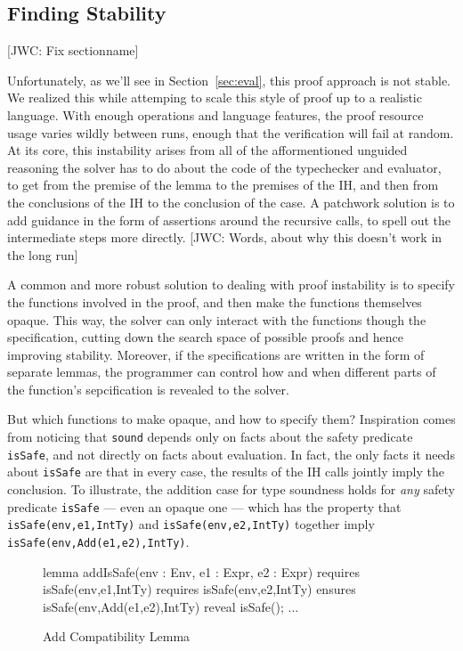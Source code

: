 \documentclass[sigplan,review,screen,anonymous]{acmart}
\newcommand{\comm}[3]{\textcolor{#1}{[#2: #3]}}
\newcommand{\jwc}[1]{\comm{dkgreen}{JWC}{#1}}
\begin{document}
\subsection*{Finding Stability}
\jwc{Fix sectionname}

Unfortunately, as we'll see in Section~\ref{sec:eval}, this proof approach is
not stable. We realized this while attemping to scale this style
of proof up to a realistic language. With enough operations and language
features, the proof resource usage varies wildly between runs,
enough that the verification will fail at random. At its core, this
instability arises from all of the afformentioned unguided reasoning the solver has to do about the
code of the typechecker and evaluator,
to get from the premise of the lemma to the premises of the IH, and then
from the conclusions of the IH to the conclusion of the case.
A patchwork solution is to add guidance in the form of assertions around the
recursive calls, to spell out the intermediate steps more directly.
\jwc{Words, about why this doesn't work in the long run}

A common and more robust solution to dealing with proof instability is to specify
the functions involved in the proof, and then make the functions themselves opaque.
This way, the solver can only interact with the functions though the specification,
cutting down the search space of possible proofs and hence improving stability.
Moreover, if the specifications are written in the form of separate lemmas,
the programmer can control how and when different parts of the function's sepcification
is revealed to the solver.

But which functions to make opaque, and how to specify them?
Inspiration comes from noticing that \texttt{sound} depends only on
facts about the safety predicate \texttt{isSafe}, and not directly
on facts about evaluation. In fact, the only facts it needs about \texttt{isSafe}
are that in every case, the results of the IH calls jointly imply the conclusion.
To illustrate, the addition case for type soundness holds
for \emph{any} safety predicate \texttt{isSafe} --- even an opaque one --- which has the property
that \texttt{isSafe(env,e1,IntTy)} and \texttt{isSafe(env,e2,IntTy)}
together imply \texttt{isSafe(env,Add(e1,e2),IntTy)}.


\begin{figure}
\begin{dafny}
lemma addIsSafe(env : Env, e1 : Expr, e2 : Expr)
  requires isSafe(env,e1,IntTy)
  requires isSafe(env,e2,IntTy)
  ensures isSafe(env,Add(e1,e2),IntTy)
{reveal isSafe(); ...}
\end{dafny}
  \caption{Add Compatibility Lemma}
  \label{fig:add-is-safe}
\end{figure}
\end{document}
